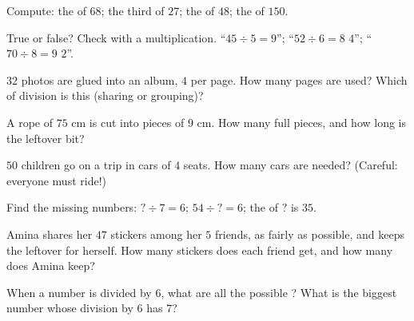 \begin{exercise}[$\star$]\label{exo:g3:division:4}
Compute: the  of $68$; the third of $27$; the  of $48$;
the  of $150$.
\end{exercise}

\begin{exercise}[$\star$]\label{exo:g3:division:5}
True or false? Check with a multiplication.
``$45 \div 5 = 9$''; \quad ``$52 \div 6 = 8$  $4$'';
\quad ``$70 \div 8 = 9$  $2$''.
\end{exercise}

\begin{exercise}[$\star$]\label{exo:g3:division:6}
$32$ photos are glued into an album, $4$ per page. How many pages are
used? Which  of division is this (sharing or grouping)?
\end{exercise}

\begin{exercise}[$\star$]\label{exo:g3:division:7}
A rope of $75$ cm is cut into pieces of $9$ cm. How many full pieces,
and how long is the leftover bit?
\end{exercise}

\begin{exercise}[$\star$]\label{exo:g3:division:8}
$50$ children go on a trip in cars of $4$ seats. How many cars are
needed? (Careful: everyone must ride!)
\end{exercise}

\begin{exercise}[$\star$]\label{exo:g3:division:9}
Find the missing numbers: $? \div 7 = 6$; \quad
$54 \div ? = 6$; \quad the  of $?$ is $35$.
\end{exercise}

\begin{exercise}[$\star\star$]\label{exo:g3:division:10}
Amina shares her $47$ stickers among her $5$ friends, as fairly as
possible, and keeps the leftover for herself. How many stickers does
each friend get, and how many does Amina keep?
\end{exercise}

\begin{exercise}[$\star\star$]\label{exo:g3:division:11}
When a number is divided by $6$, what are all the possible
? What is the biggest number whose division by $6$ has
 $7$?
\end{exercise}

